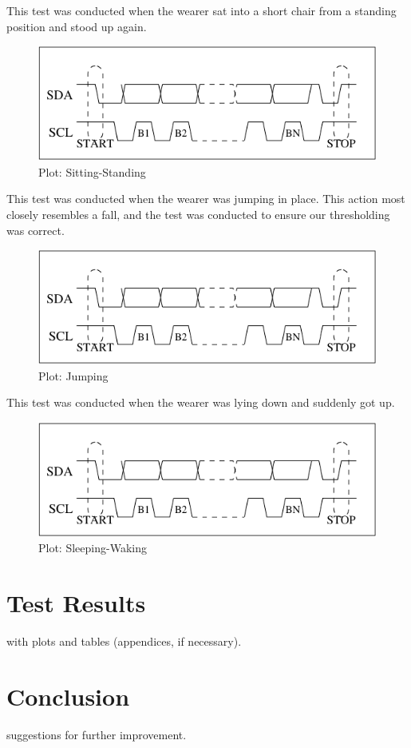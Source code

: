 \documentclass[11pt, a4paper]{article}
\begin{document}
\noindent This test was conducted when the wearer sat into a short chair from a
standing position and stood up again.
\begin{figure}
    \centering
    \includegraphics[width=\linewidth]{I2C_Timing.pdf}
    \caption{Plot: Sitting-Standing}
    \label{fig:sitting_standing}
\end{figure}

\noindent This test was conducted when the wearer was jumping in place. This
action most closely resembles a fall, and the test was conducted to ensure our
thresholding was correct.
\begin{figure}
    \centering
    \includegraphics[width=\linewidth]{I2C_Timing.pdf}
    \caption{Plot: Jumping}
    \label{fig:jumping}
\end{figure}

\noindent This test was conducted when the wearer was lying down and suddenly
got up.
\begin{figure}
    \centering
    \includegraphics[width=\linewidth]{I2C_Timing.pdf}
    \caption{Plot: Sleeping-Waking}
    \label{fig:sleeping}
\end{figure}

\section{Test Results}
with plots and tables (appendices, if necessary).

\section{Conclusion}
suggestions for further improvement.




\end{document}
